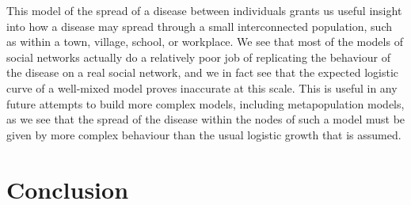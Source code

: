 \documentclass[12pt,a4paper,openany,twoside]{book}
\begin{document}
This model of the spread of a disease between individuals grants us useful insight into how a disease may spread through a small interconnected population, such as within a town, village, school, or workplace. We see that most of the models of social networks actually do a relatively poor job of replicating the behaviour of the disease on a real social network, and we in fact see that the expected logistic curve of a well-mixed model proves inaccurate at this scale. This is useful in any future attempts to build more complex models, including metapopulation models, as we see that the spread of the disease within the nodes of such a model must be given by more complex behaviour than the usual logistic growth that is assumed.

\chapter{Conclusion}
\end{document}
